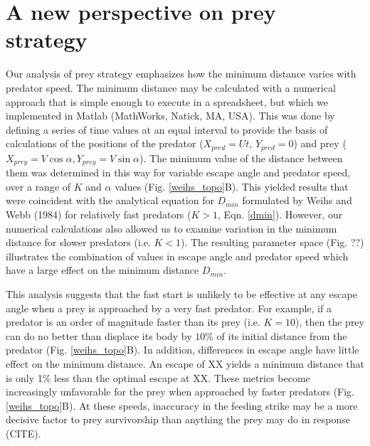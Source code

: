 \documentclass[12pt]{article}
\begin{document}
\section{A new perspective on prey strategy}

Our analysis of prey strategy emphasizes how the minimum distance varies with predator speed. The minimum distance may be calculated with a numerical approach that is simple enough to execute in a spreadsheet, but which we implemented in Matlab (MathWorks, Natick, MA, USA). This was done by defining a series of time values at an equal interval to provide the basis of calculations of the positions of the predator ($X_{pred} = Ut$, $Y_{pred} = 0$) and prey ($X_{prey}=V\cos\alpha,Y_{prey}=V\sin\alpha$). The minimum value of the distance between them was determined in this way for variable escape angle and predator speed, over a range of $K$ and $\alpha$ values (Fig. \ref{weihs_topo}B). This yielded results that were coincident with the analytical equation for $D_{min}$ formulated by Weihs and Webb (1984) for relatively fast predators ($K>1$, Eqn. \ref{dmin}). However, our numerical calculations also allowed us to examine variation in the minimum distance for slower predators (i.e. $K<1$). The resulting parameter space (Fig. ??) illustrates the combination of values in escape angle and predator speed which have a large effect on the minimum distance $D_{min}$.

This analysis suggests that the fast start is unlikely to be effective at any escape angle when a prey is approached by a very fast predator. For example, if a predator is an order of magnitude faster than its prey (i.e. $K=10$), then the prey can do no better than displace its body by $10\%$ of its initial distance from the predator (Fig. \ref{weihs_topo}B). In addition, differences in escape angle have little effect on the minimum distance. An escape of  XX\textdegree\hspace{2pt} yields a minimum distance that is only 1\% less than the optimal escape at XX\textdegree. These metrics become increasingly unfavorable for the prey when approached by faster predators (Fig. \ref{weihs_topo}B). At these speeds, inaccuracy in the feeding strike may be a more decisive factor to prey survivorship than anything the prey may do in response (CITE).
\end{document}
